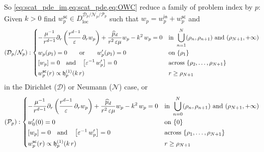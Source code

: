 \documentclass[12pt,a4paper]{article}
\theoremstyle{definition}
\theoremstyle{plain}
\theoremstyle{remark}
\newcommand{\calD}{\mathcal{D}}
\newcommand{\calN}{\mathcal{N}}
\newcommand{\calP}{\mathcal{P}}
\newcommand{\frh}{\mathop{}\!\mathfrak{h}^{(1)}}
\newcommand{\plr}[1]{\left(#1\right)}
\newcommand{\clr}[1]{\left[#1\right]}
\newcommand{\eps}{\varepsilon}
\newcommand{\loc}{\mathrm{loc}}
\newcommand{\inc}{\mathsf{in}}
\newcommand{\sca}{\mathsf{sc}}
\begin{document}
So \cref{eq:scat_pde_im,eq:scat_pde,eq:OWC} reduce a family of problem index by $p$: Given $k > 0$ find $w_p^\sca \in D^{\calD_p/\calN_p/\calP_p}_\loc$ such that $w_p = w_p^\inc + w_p^\sca$ and
\begin{equation}
    (\calD_p/\calN_p) : \begin{dcases}
        -\frac{\mu^{-1}}{r^{d-1}} \partial_r\plr{\frac{r^{d-1}}{\eps}\, \partial_r w_p} + \dfrac{\widehat{p}_d}{r^2\, \eps\mu} w_p - k^2\, w_p = 0 & \text{in } \bigcup_{n=1}^N (\rho_n, \rho_{n+1}) \text{ and } (\rho_{N+1}, +\infty) \\
        w_p(\rho_1) = 0 \qquad \text{or} \qquad w_p'(\rho_1) = 0                                                                                   & \text{on } \{\rho_1\}                                                              \\
        \clr{w_p} = 0 \quad\text{and}\quad \clr{\eps^{-1}\, w_p'} = 0                                                                              & \text{across } \{\rho_2, \ldots, \rho_{N+1}\}                                      \\
        w_p^\sca(r) \propto \frh_p(k\, r)                                                                                                          & r \ge \rho_{N+1}
    \end{dcases}
\end{equation}
in the Dirichlet ($\calD$) or Neumann ($\calN$) case, or
\begin{equation}
    (\calP_p) : \begin{dcases}
        -\frac{\mu^{-1}}{r^{d-1}} \partial_r\plr{\frac{r^{d-1}}{\eps}\, \partial_r w_p} + \dfrac{\widehat{p}_d}{r^2\, \eps\mu} w_p - k^2\, w_p = 0 & \text{in } \bigcup_{n=0}^N (\rho_n, \rho_{n+1}) \text{ and } (\rho_{N+1}, +\infty) \\
        w_0'(0) = 0                                                                                                                                & \text{on } \{0\}                                                                   \\
        \clr{w_p} = 0 \quad\text{and}\quad \clr{\eps^{-1}\, w_p'} = 0                                                                              & \text{across } \{\rho_1, \ldots, \rho_{N+1}\}                                      \\
        w_p^\sca(r) \propto \frh_p(k\, r)                                                                                                          & r \ge \rho_{N+1}
    \end{dcases}
\end{equation}
\end{document}
